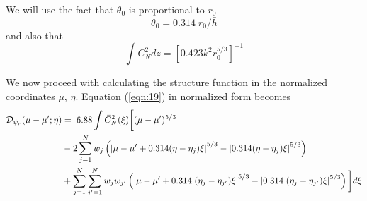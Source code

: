 \documentclass[11pt, oneside]{article}   	%
\begin{document}
We will use the fact that $\theta_0$ is proportional to $r_0$
\begin{equation}
\theta_0 = 0.314 \; r_0 / \bar h
\end{equation}
and also that
\begin{equation}
\int C_N^2 dz = \left [ 0.423 k^2 r_0^{5/3} \right ]^{-1}
\end{equation}

We now proceed with calculating the structure function in the normalized coordinates $\mu$, $\eta$. Equation (\ref{eqn:19}) in normalized form becomes
\begin{align}
\label{eqn:e27}
{\cal D}_{\psi_r}(\mu - \mu';\eta) &= \;6.88 \int \bar C_N^2 (\xi) \bigg[ (\mu - \mu')^{5/3} \nonumber \\
                       &- 2 \sum_{j=1}^N w_j \left(\left|\mu-\mu' + 0.314(\eta - \eta_j) \xi\right|^{5/3}
                       - \left |0.314(\eta - \eta_j) \xi\right|^{5/3}\right) \nonumber \\
                       &+ \sum_{j=1}^N \sum_{j'=1}^N w_j w_{j'} \left(\left|\mu-\mu' + 0.314\; (\eta_j - \eta_{j'})\xi\right|^{5/3}
                       - \left|0.314\; (\eta_j - \eta_{j'})\xi\right|^{5/3}\right)
                        \bigg] d \xi
\end{align}
\end{document}
